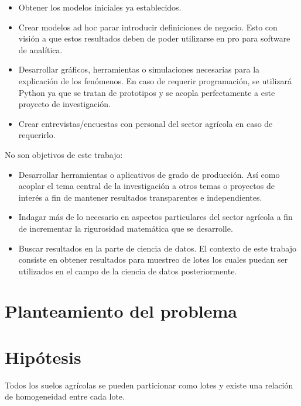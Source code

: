 \documentclass{report}
\begin{document}
\begin{itemize}
    \item Obtener los modelos iniciales ya establecidos.
    
    \item Crear modelos ad hoc parar introducir definiciones de negocio. Esto con visión a que estos resultados deben de poder utilizarse en pro para software de analítica.
    
    \item Desarrollar gráficos, herramientas o simulaciones necesarias para la explicación de los fenómenos. En caso de requerir programación, se utilizará Python ya que se tratan de prototipos y se acopla perfectamente a este proyecto de investigación.
    
    \item Crear entrevistas/encuestas con personal del sector agrícola en caso de requerirlo.
\end{itemize}

\bigbreak

No son objetivos de este trabajo:

\begin{itemize}
    \item Desarrollar herramientas o aplicativos de grado de producción. Así como acoplar el tema central de la investigación a otros temas o proyectos de interés a fin de mantener resultados transparentes e independientes.
    
    \item Indagar más de lo necesario en aspectos particulares del sector agrícola a fin de incrementar la rigurosidad matemática que se desarrolle.
    
    \item Buscar resultados en la parte de ciencia de datos. El contexto de este trabajo consiste en obtener resultados para muestreo de lotes los cuales puedan ser utilizados en el campo de la ciencia de datos posteriormente.
\end{itemize}

\section{Planteamiento del problema}


\section{Hipótesis}

Todos los suelos agrícolas se pueden particionar como lotes y existe una relación de homogeneidad entre cada lote.
\end{document}
